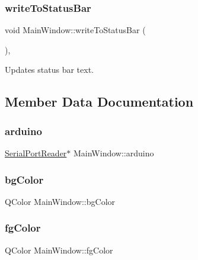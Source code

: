 \subsubsection{\texorpdfstring{write\+To\+Status\+Bar}{writeToStatusBar}}
{\footnotesize\ttfamily void Main\+Window\+::write\+To\+Status\+Bar (\begin{DoxyParamCaption}{ }\end{DoxyParamCaption})\hspace{0.3cm}{\ttfamily [private]}, {\ttfamily [slot]}}



Updates status bar text. 



\subsection{Member Data Documentation}
\mbox{\label{class_main_window_aba5a40e0587b38a584b92583600373f6}} 
\subsubsection{\texorpdfstring{arduino}{arduino}}
{\footnotesize\ttfamily \mbox{\hyperlink{class_serial_port_reader}{Serial\+Port\+Reader}}$\ast$ Main\+Window\+::arduino\hspace{0.3cm}{\ttfamily [private]}}

\mbox{\label{class_main_window_a4a1005daadc7447af6907c57b54e41ab}} 
\subsubsection{\texorpdfstring{bg\+Color}{bgColor}}
{\footnotesize\ttfamily Q\+Color Main\+Window\+::bg\+Color\hspace{0.3cm}{\ttfamily [private]}}

\mbox{\label{class_main_window_a1f5455abfb51d7c4733bfad76ac60606}} 
\subsubsection{\texorpdfstring{fg\+Color}{fgColor}}
{\footnotesize\ttfamily Q\+Color Main\+Window\+::fg\+Color\hspace{0.3cm}{\ttfamily [private]}}

